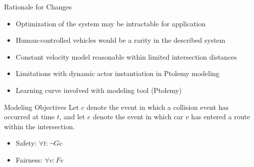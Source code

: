 \begin{frame}{Rationale for Changes}
\begin{itemize}
\item Optimization of the system may be intractable for application
\item Human-controlled vehicles would be a rarity in the described system
\item Constant velocity model reasonable within limited intersection distances
\item Limitations with dynamic actor instantiation in Ptolemy modeling
\item Learning curve involved with modeling tool (Ptolemy)
\end{itemize}
\end{frame}

\begin{frame}{Modeling Objectives}
Let $c$ denote the event in which a collision event has occurred at time $t$,
and let $e$ denote the event in which car $v$ has entered a route within
the intersection.
\begin{itemize}
\item Safety: $\forall t: \neg G c$
\item Fairness: $\forall v: F e$
\end{itemize}
\end{frame}
